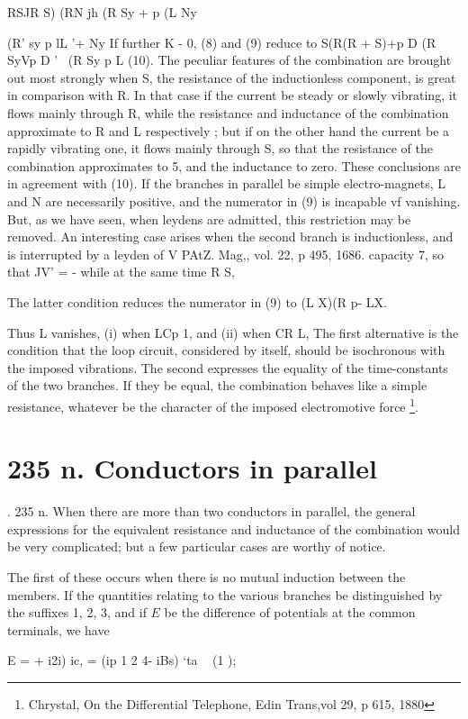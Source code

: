  RSJR S) (RN jh (R Sy + p (L Ny


  (R' sy p lL '+ Ny If further K - 0, (8) and (9) reduce to S(R(R + S)+p D (R
SyVp D ' ~(R Sy p L (10).  The peculiar features of the combination are brought
out most strongly when S, the resistance of the inductionless component, is
great in comparison with R. In that case if the current be steady or slowly
vibrating, it flows mainly through R, while the resistance and inductance of
the combination approximate to R and L respectively ; but if on the other hand
the current be a rapidly vibrating one, it flows mainly through S, so that the
resistance of the combination approximates to 5, and the inductance to zero.
These conclusions are in agreement with (10).  If the branches in parallel be
simple electro-magnets, L and N are necessarily positive, and the numerator in
(9) is incapable vf vanishing. But, as we have seen, when leydens are admitted,
this restriction may be removed. An interesting case arises when the second
branch is inductionless, and is interrupted by a leyden of V PAtZ. Mag,, vol.  22,
p 495, 1686. capacity 7, so that JV' = - while at the same time R S,

The latter condition reduces the numerator in (9) to (L X)(R p- LX.

Thus L vanishes, (i) when LCp  1, and (ii) when CR L, The first alternative is
the condition that the loop circuit, considered by itself, should be
isochronous with the imposed vibrations.  The second expresses the equality of
the time-constants of the two branches. If they be equal, the combination
behaves like a simple resistance, whatever be the character of the imposed
electromotive force
\footnote{Chrystal, On the Differential Telephone, Edin Trans,vol 29, p 615, 1880}.

\section{235 n. Conductors in parallel}.
235 n. When there are more than two conductors in parallel,
the general expressions for the equivalent resistance and inductance
of the combination would be very complicated; but a few
particular cases are worthy of notice.

The first of these occurs when there is no mutual induction between the
members. If the quantities relating to the various branches be distinguished by
the suffixes 1, 2, 3, and if \(E\) be the difference of potentials at the common
terminals, we have

E = + i2i) ic, = (ip 1 2 4- iBs) ‘ta ~ (1 );

